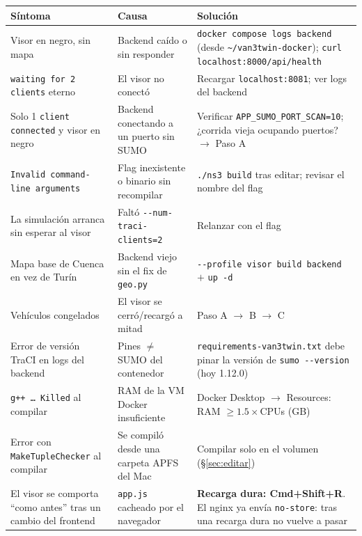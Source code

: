 \documentclass[11pt,a4paper]{article}
\begin{document}
\begin{center}
\small
\begin{tabular}{@{}p{}p{}p{}@{}}
\toprule
\textbf{Síntoma} & \textbf{Causa} & \textbf{Solución} \\
\midrule
Visor en negro, sin mapa & Backend caído o sin responder & \texttt{docker compose logs backend} (desde \texttt{\textasciitilde/van3twin-docker}); \texttt{curl localhost:8000/api/health} \\
\texttt{waiting for 2 clients} eterno & El visor no conectó & Recargar \texttt{localhost:8081}; ver logs del backend \\
Solo 1 \texttt{client connected} y visor en negro & Backend conectando a un puerto sin SUMO & Verificar \texttt{APP\_SUMO\_PORT\_SCAN=10}; ¿corrida vieja ocupando puertos? $\rightarrow$ Paso A \\
\texttt{Invalid command-line arguments} & Flag inexistente o binario sin recompilar & \texttt{./ns3 build} tras editar; revisar el nombre del flag \\
La simulación arranca sin esperar al visor & Faltó \texttt{-{}-num-traci-clients=2} & Relanzar con el flag \\
Mapa base de Cuenca en vez de Turín & Backend viejo sin el fix de \texttt{geo.py} & \texttt{-{}-profile visor build backend} $+$ \texttt{up -d} \\
Vehículos congelados & El visor se cerró/recargó a mitad & Paso A $\rightarrow$ B $\rightarrow$ C \\
Error de versión TraCI en logs del backend & Pines $\neq$ SUMO del contenedor & \texttt{requirements-van3twin.txt} debe pinar la versión de \texttt{sumo -{}-version} (hoy 1.12.0) \\
\texttt{g++ \ldots{} Killed} al compilar & RAM de la VM Docker insuficiente & Docker Desktop $\rightarrow$ Resources: RAM $\geq 1.5\times$CPUs (GB) \\
Error con \texttt{MakeTupleChecker} al compilar & Se compiló desde una carpeta APFS del Mac & Compilar solo en el volumen (\S\ref{sec:editar}) \\
El visor se comporta ``como antes'' tras un cambio del frontend & \texttt{app.js} cacheado por el navegador & \textbf{Recarga dura: \textsf{Cmd+Shift+R}}. El nginx ya envía \texttt{no-store}: tras una recarga dura no vuelve a pasar \\
\bottomrule
\end{tabular}
\end{center}
\end{document}
